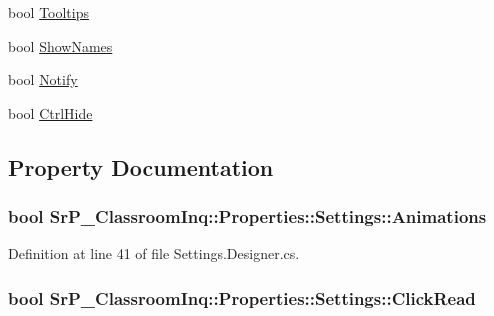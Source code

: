 \begin{DoxyCompactItemize}
\item 
bool \hyperlink{class_sr_p___classroom_inq_1_1_properties_1_1_settings_a321180f5ee03a2226b34422de41e201a}{\-Tooltips}
\item 
bool \hyperlink{class_sr_p___classroom_inq_1_1_properties_1_1_settings_abb110d7ebcceac8e89e8e7fced9da2b4}{\-Show\-Names}
\item 
bool \hyperlink{class_sr_p___classroom_inq_1_1_properties_1_1_settings_ad0c83bd5c1a79ad9f1690f5096d48306}{\-Notify}
\item 
bool \hyperlink{class_sr_p___classroom_inq_1_1_properties_1_1_settings_a503512222454f2c3d7bb0dbda6437ac0}{\-Ctrl\-Hide}
\end{DoxyCompactItemize}


\subsection{\-Property \-Documentation}
\hypertarget{class_sr_p___classroom_inq_1_1_properties_1_1_settings_ab4e4d47d4289ea293aa6c3176ef7ba39}{
\subsubsection[{\-Animations}]{\setlength{\rightskip}{0pt plus 5cm}bool \-Sr\-P\-\_\-\-Classroom\-Inq\-::\-Properties\-::\-Settings\-::\-Animations}}
\label{class_sr_p___classroom_inq_1_1_properties_1_1_settings_ab4e4d47d4289ea293aa6c3176ef7ba39}


\-Definition at line 41 of file \-Settings.\-Designer.\-cs.

\hypertarget{class_sr_p___classroom_inq_1_1_properties_1_1_settings_af45458c33afb096610d416c61ac86e16}{
\subsubsection[{\-Click\-Read}]{\setlength{\rightskip}{0pt plus 5cm}bool \-Sr\-P\-\_\-\-Classroom\-Inq\-::\-Properties\-::\-Settings\-::\-Click\-Read}}
\label{class_sr_p___classroom_inq_1_1_properties_1_1_settings_af45458c33afb096610d416c61ac86e16}



